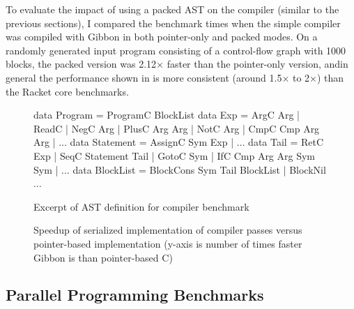 To evaluate the impact of using a packed AST on the compiler (similar to the
previous sections), I compared the benchmark times when the simple compiler was
compiled with Gibbon in both pointer-only and packed modes. On a randomly
generated input program consisting of a control-flow graph with 1000 blocks, the
packed version was 2.12$\times$ faster than the pointer-only version, andin general
the performance shown in  is more consistent
(around 1.5$\times$ to 2$\times$) than the Racket core benchmarks.

\begin{figure}
\footnotesize
\begin{code}
data Program = ProgramC BlockList
data Exp = ArgC Arg | ReadC | NegC Arg | PlusC Arg Arg | NotC Arg
         | CmpC Cmp Arg Arg | $\ldots$
data Statement = AssignC Sym Exp | $\ldots$
data Tail = RetC Exp | SeqC Statement Tail | GotoC Sym
          | IfC Cmp Arg Arg Sym Sym | $\ldots$
data BlockList = BlockCons Sym Tail BlockList | BlockNil
$\ldots$
\end{code}
\caption{Excerpt of AST definition for compiler benchmark}\label{fig:coursecompilergrammar}
\end{figure}

\begin{figure}
  
  \caption{Speedup of serialized implementation of compiler passes versus
  pointer-based implementation (y-axis is number of times faster Gibbon is than
  pointer-based C)}\label{fig:coursecompilerbench}
\end{figure}

\subsection{Parallel Programming Benchmarks}\label{subsec:parallelbench}

